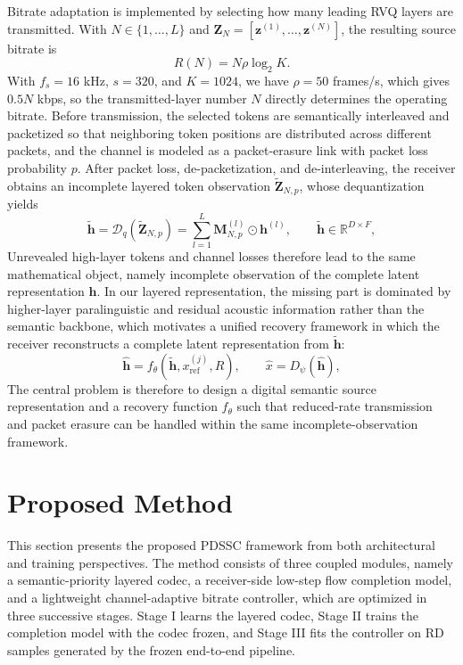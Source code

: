 \documentclass[conference]{IEEEtran}
\begin{document}
\par Bitrate adaptation is implemented by selecting how many leading RVQ layers are transmitted. With $N\in\{1,\ldots,L\}$ and $\mathbf{Z}_{N}=[\mathbf{z}^{(1)},\ldots,\mathbf{z}^{(N)}]$, the resulting source bitrate is
\begin{equation}
R(N)=N\rho\log_2 K .
\end{equation}
With $f_s=16$ kHz, $s=320$, and $K=1024$, we have $\rho=50$ frames/s, which gives $0.5N$ kbps, so the transmitted-layer number $N$ directly determines the operating bitrate. Before transmission, the selected tokens are semantically interleaved and packetized so that neighboring token positions are distributed across different packets, and the channel is modeled as a packet-erasure link with packet loss probability $p$. After packet loss, de-packetization, and de-interleaving, the receiver obtains an incomplete layered token observation $\tilde{\mathbf{Z}}_{N,p}$, whose dequantization yields
\begin{equation}
\widetilde{\mathbf{h}}=\mathcal{D}_{q}\!\left(\tilde{\mathbf{Z}}_{N,p}\right)
=\sum_{l=1}^{L}\mathbf{M}^{(l)}_{N,p}\odot \mathbf{h}^{(l)},\qquad
\widetilde{\mathbf{h}}\in\mathbb{R}^{D\times F},
\end{equation}
Unrevealed high-layer tokens and channel losses therefore lead to the same mathematical object, namely incomplete observation of the complete latent representation $\mathbf{h}$. In our layered representation, the missing part is dominated by higher-layer paralinguistic and residual acoustic information rather than the semantic backbone, which motivates a unified recovery framework in which the receiver reconstructs a complete latent representation from $\widetilde{\mathbf{h}}$:
\begin{equation}
\widehat{\mathbf{h}}=f_{\theta}(\widetilde{\mathbf{h}},x_{\mathrm{ref}}^{(j)},R),\qquad
\hat{x}=D_{\psi}(\widehat{\mathbf{h}}),
\end{equation}
The central problem is therefore to design a digital semantic source representation and a recovery function $f_{\theta}$ such that reduced-rate transmission and packet erasure can be handled within the same incomplete-observation framework.

\section{Proposed Method}
This section presents the proposed PDSSC framework from both architectural and training perspectives. The method consists of three coupled modules, namely a semantic-priority layered codec, a receiver-side low-step flow completion model, and a lightweight channel-adaptive bitrate controller, which are optimized in three successive stages. Stage I learns the layered codec, Stage II trains the completion model with the codec frozen, and Stage III fits the controller on RD samples generated by the frozen end-to-end pipeline.
\end{document}
